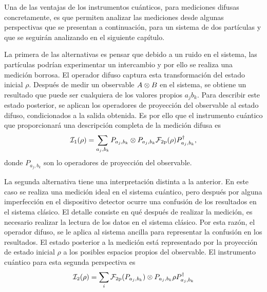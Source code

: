 

Una de las ventajas de los instrumentos cuánticos, para mediciones difusas concretamente, es que permiten analizar las mediciones desde algunas perspectivas que se presentan a continuación, para un sistema de  dos partículas y que se seguirán analizando en el siguiente capítulo.


La primera de las alternativas es pensar que debido a un ruido en el sistema, las partículas podrían experimentar un intercambio y por ello se realiza una medición borrosa. El operador difuso captura esta transformación del estado inicial $\rho$. Después de medir un observable ${A \otimes B}$ en el sistema, se obtiene un resultado que puede ser cualquiera de los valores propios $a_j b_k$. Para describir este estado posterior, se aplican los operadores de proyección del observable al estado difuso, condicionados a la salida obtenida.  Es por ello que el instrumento cuántico que proporcionará una descripción completa de la medición difusa es \begin{equation}\label{eq:primer-instrumento-general}
    \mathcal{I}_{1}(\rho)=\sum_{a_j, b_k} P_{a_j,b_k}\otimes P_{a_j,b_k}\mathcal{F}_{2\text{p}}(\rho)P_{a_j,b_k}^\dagger,
    \end{equation}  donde $P_{a_j,b_k}$ son lo operadores de proyección del observable.



    La segunda alternativa tiene una interpretación distinta a la anterior. En este caso se realiza una medición ideal en el sistema cuántico, pero después por alguna imperfección en el dispositivo detector ocurre una confusión de los resultados en el sistema clásico. El detalle consiste en qué después de realizar la medición, es necesario realizar la lectura de los datos en el sistema clásico. Por esta razón, el operador difuso, se le aplica al sistema ancilla para representar la confusión en los resultados. El estado posterior a la medición está representado por la proyección de estado inicial $\rho$ a los posibles espacios propios del observable. El instrumento cuántico para esta segunda perspectiva es\begin{equation}\label{eq:segundo-instrumento-ciuantico}
        \mathcal{I}_2(\rho)=\sum_i\mathcal{F}_{2\text{p}}(P_{a_j,b_k})\otimes P_{a_j,b_k}\rho P_{a_j,b_k}^\dagger
    \end{equation} 
    

